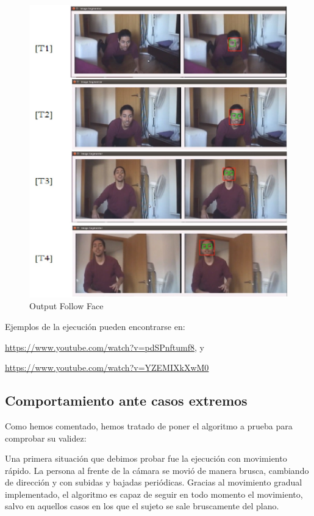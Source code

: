 \begin{figure}[H]
  \begin{center}
    \includegraphics[width=0.98\linewidth]{figures/ffoutput.jpg}
		\caption{Output Follow Face}
		\label{fig.ffoutput}
		\end{center}
\end{figure}

Ejemplos de la ejecución pueden encontrarse en:
 
\url{https://www.youtube.com/watch?v=pdSPnftumf8}, y
 
\url{https://www.youtube.com/watch?v=YZEMIXkXwM0}

\subsection{Comportamiento ante casos extremos}
Como hemos comentado, hemos tratado de poner el algoritmo a prueba para comprobar su validez:

Una primera situación que debimos probar fue la ejecución con movimiento rápido. La persona al frente de la cámara se movió de manera brusca, cambiando de dirección y con subidas y bajadas periódicas. Gracias al movimiento gradual implementado, el algoritmo es capaz de seguir en todo momento el movimiento, salvo en aquellos casos en los que el sujeto se sale bruscamente del plano. 

